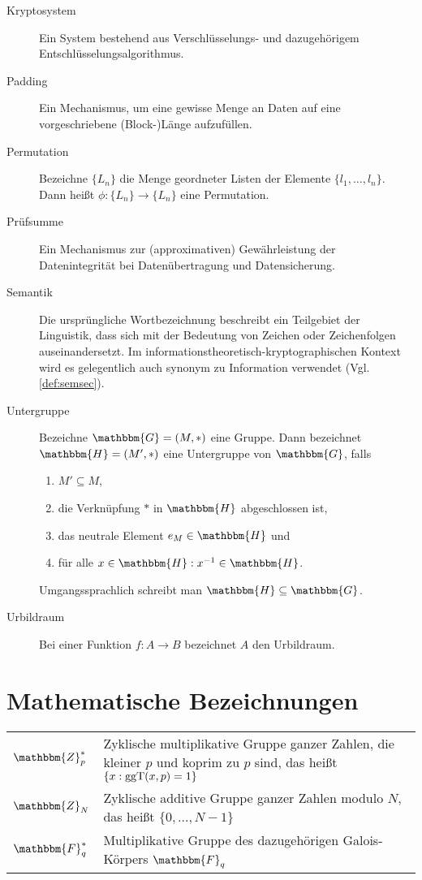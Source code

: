 \begin{description}
	\item[Kryptosystem] Ein System bestehend aus Verschlüsselungs- und dazugehörigem Entschlüsselungsalgorithmus.
	\item[Padding] Ein Mechanismus, um eine gewisse Menge an Daten auf eine vorgeschriebene (Block-)Länge aufzufüllen. %
	\item[Permutation] Bezeichne $\{L_n\}$ die Menge geordneter Listen der Elemente $\{l_1, \dots, l_n\}$. Dann heißt $\phi\colon \{L_n\} \rightarrow \{L_n\}$ eine Permutation.
	\item[Prüfsumme] Ein Mechanismus zur (approximativen) Gewährleistung der Datenintegrität bei Datenübertragung und Datensicherung.
	\item[Semantik] Die ursprüngliche Wortbezeichnung beschreibt ein Teilgebiet der Linguistik, dass sich mit der Bedeutung von Zeichen oder Zeichenfolgen
	auseinandersetzt. Im informationstheoretisch-kryptographischen Kontext wird es gelegentlich auch synonym zu Information verwendet (Vgl. 
	\ref{def:semsec}).
	\item[Untergruppe] Bezeichne $\mathbbm{G} = (M, \ast)$ eine Gruppe. Dann bezeichnet $\mathbbm{H} = (M', \ast)$ eine Untergruppe von $\mathbbm{G}$,
	falls
	\begin{enumerate}
		\item $M' \subseteq M$,
		\item die Verknüpfung $\ast$ in $\mathbbm{H}$ abgeschlossen ist,
		\item das neutrale Element $e_M \in \mathbbm{H}$ und
		\item für alle $x \in \mathbbm{H} : x^{-1} \in \mathbbm{H}$.
	\end{enumerate}
	Umgangssprachlich schreibt man $\mathbbm{H} \subseteq \mathbbm{G}$.
	\item[Urbildraum] Bei einer Funktion $f\colon A \rightarrow B$ bezeichnet $A$ den Urbildraum.
\end{description}

\renewcommand{\arraystretch}{1.5}
\section{Mathematische Bezeichnungen}
\begin{tabularx}{\textwidth}{ p{} | X }
	$\mathbbm{Z}^{\ast}_p$ & Zyklische multiplikative Gruppe ganzer Zahlen, die kleiner $p$ und koprim zu $p$ sind, das heißt $\{x : \operatorname{ggT}(x, p) = 1\}$\\
	$\mathbbm{Z}_N$ & Zyklische additive Gruppe ganzer Zahlen modulo $N$, das heißt ${\{0, \dots, N-1\}}$\\
	$\mathbbm{F}^{\ast}_q$ & Multiplikative Gruppe des dazugehörigen Galois-Körpers $\mathbbm{F}_q$
\end{tabularx}

